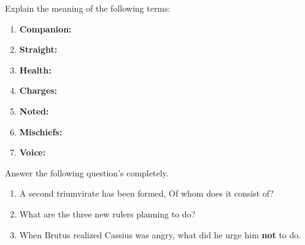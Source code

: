 \documentclass[12pt]{article} %
\begin{document}
\vspace*{6cm}


\begin{qstn}
  Explain the meaning of the following terms:
      \begin{enumerate}[label=(\alph*)]
        \item \textbf{Companion:}
          \vspace*{1cm}
        \item \textbf{Straight:}
          \vspace*{1cm}
        \item \textbf{Health:}
          \vspace*{1cm}
        \item \textbf{Charges:}
          \vspace*{1cm}
        \item \textbf{Noted:}
          \vspace*{1cm}
        \item \textbf{Mischiefs:}
          \vspace*{1cm}
        \item \textbf{Voice:}
          \vspace*{1cm}
      \end{enumerate}



\end{qstn}

\newpage

\begin{qstn}
  Answer the following question's completely.
  \begin{enumerate}
    \item A second triumvirate has been formed, Of whom does it consist of?

    \vspace*{3cm}

    \item What are the three new rulers planning to do?
        \vspace*{4cm}

    \item When Brutus realized Cassius was angry, what did he urge him \textbf{not} to do.
  \end{enumerate}


\end{qstn}
\end{document}
